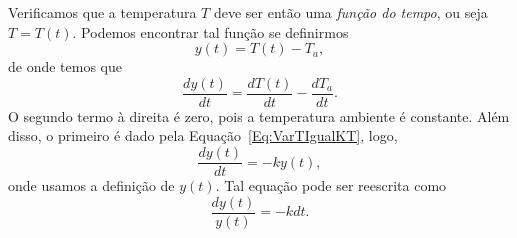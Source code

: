 Verificamos que a temperatura $T$ deve ser então uma \emph{função do tempo}, ou seja $T = T(t)$. Podemos encontrar tal função se definirmos
\begin{equation}
	y(t) = T(t) - T_a,
\end{equation}
%
de onde temos que
\begin{equation}
	\frac{dy(t)}{dt} = \frac{dT(t)}{dt} - \frac{dT_a}{dt}.
\end{equation}
%
O segundo termo à direita é zero, pois a temperatura ambiente é constante. Além disso, o primeiro é dado pela Equação~\ref{Eq:VarTIgualKT}, logo,
\begin{equation}
	\frac{dy(t)}{dt} = -ky(t),
\end{equation}
%
onde usamos a definição de $y(t)$. Tal equação pode ser reescrita como
\begin{equation}
	\frac{dy(t)}{y(t)} = -k dt.
\end{equation}

